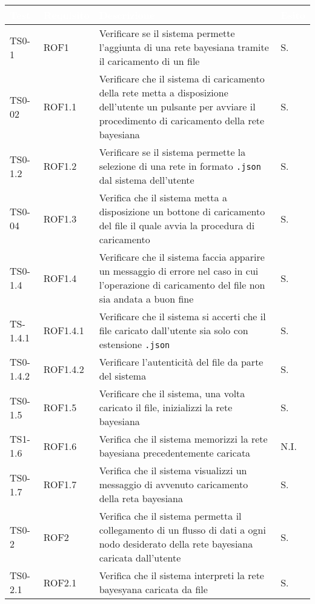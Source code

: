 \begin{longtable}{|C{.15\textwidth}|C{.14\textwidth}|m{.51\textwidth}|C{.08\textwidth}|}
\hline
{}\textbf{\textcolor{white}{Test}} & \textbf{\textcolor{white}{Requisito}} & \textbf{\textcolor{white}{Descrizione}} & \textbf{\textcolor{white}{Esito}}\\
\hline \hline
\endhead

TS0-1 & ROF1 & Verificare se il sistema permette l'aggiunta di una rete bayesiana tramite il caricamento di un file & S. \\
\hline
{} TS0-02 & ROF1.1 & Verificare che il sistema di caricamento della rete metta a disposizione dell'utente un pulsante per avviare il procedimento di caricamento della rete bayesiana & S.\\
\hline
TS0-1.2 & ROF1.2 & Verificare se il sistema permette la selezione di una rete in formato \texttt{.json} dal sistema dell'utente & S. \\
\hline
{} TS0-04 & ROF1.3 & Verifica che il sistema metta a disposizione un bottone di caricamento del file il quale avvia la procedura di caricamento & S. \\
\hline
TS0-1.4 &  ROF1.4 & Verificare che il sistema faccia apparire un messaggio di errore nel caso in cui l'operazione di caricamento del file non sia andata a buon fine & S. \\
\hline
{} TS-1.4.1 & ROF1.4.1 & Verificare che il sistema si accerti che il file caricato dall'utente sia solo con estensione \texttt{.json} & S. \\
\hline
TS0-1.4.2 & ROF1.4.2 & Verificare l'autenticità del file da parte del sistema & S. \\
\hline 
{} TS0-1.5  & ROF1.5 & Verificare che il sistema, una volta caricato il file, inizializzi la rete bayesiana & S. \\
\hline 
TS1-1.6 & ROF1.6 & Verifica che il sistema memorizzi la rete bayesiana precedentemente caricata & N.I. \\
\hline
{} TS0-1.7 & ROF1.7 & Verifica che il sistema visualizzi un messaggio di avvenuto caricamento della reta bayesiana & S. \\
\hline
TS0-2 & ROF2 & Verifica che il sistema permetta il collegamento di un flusso di dati a ogni nodo desiderato della rete bayesiana caricata dall'utente & S. \\
\hline
{} TS0-2.1 & ROF2.1 & Verifica che il sistema interpreti la rete bayesyana caricata da file & S. \\

\end{longtable}
